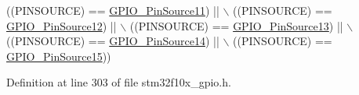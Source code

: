 \begin{DoxyCode}
                                       ((PINSOURCE) == \hyperlink{group___g_p_i_o___pin__sources_ga446be4a99e84eefb5c71a643211f598b}{GPIO\_PinSource11}) || \(\backslash\)
                                       ((PINSOURCE) == \hyperlink{group___g_p_i_o___pin__sources_gaaa64892c00d50b0fa49f0ce72a83e6e0}{GPIO\_PinSource12}) || \(\backslash\)
                                       ((PINSOURCE) == \hyperlink{group___g_p_i_o___pin__sources_gace4beb385facd306324fa9e362df5fda}{GPIO\_PinSource13}) || \(\backslash\)
                                       ((PINSOURCE) == \hyperlink{group___g_p_i_o___pin__sources_ga5fbb540a86af4015a46ac16c61ddb1f7}{GPIO\_PinSource14}) || \(\backslash\)
                                       ((PINSOURCE) == \hyperlink{group___g_p_i_o___pin__sources_ga9b29d9a9ecb1579ecedf4ea53ccbfd5b}{GPIO\_PinSource15}))
\end{DoxyCode}


Definition at line 303 of file stm32f10x\+\_\+gpio.\+h.

